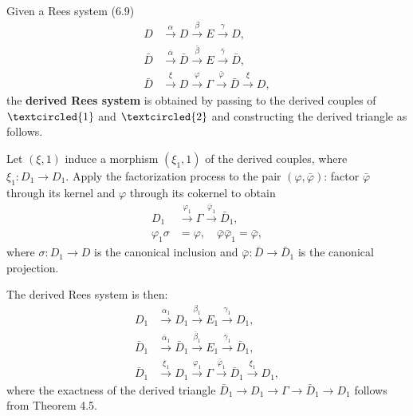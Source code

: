 Given a Rees system (6.9)
\begin{align*}
D &\xrightarrow{\alpha} D \xrightarrow{\beta} E \xrightarrow{\gamma} D, \\
\bar{D} &\xrightarrow{\bar{\alpha}} \bar{D} \xrightarrow{\bar{\beta}} E \xrightarrow{\bar{\gamma}} \bar{D}, \\
\bar{D} &\xrightarrow{\xi} D \xrightarrow{\varphi} \Gamma \xrightarrow{\bar{\varphi}} \bar{D} \xrightarrow{\xi} D,
\end{align*}
the \textbf{derived Rees system} is obtained by passing to the derived couples of $\textcircled{1}$ and $\textcircled{2}$ and constructing the derived triangle as follows.

Let $(\xi, 1)$ induce a morphism $(\xi_1, 1)$ of the derived couples, where $\xi_1 : D_1 \to D_1$. Apply the factorization process to the pair $(\varphi, \bar{\varphi})$: factor $\bar{\varphi}$ through its kernel and $\varphi$ through its cokernel to obtain
\begin{align*}
D_1 &\xrightarrow{\varphi_1} \Gamma \xrightarrow{\bar{\varphi}_1} \bar{D}_1, \\
\varphi_1 \sigma &= \varphi, \quad \bar{\varphi}\bar{\varphi}_1 = \bar{\varphi},
\end{align*}
where $\sigma : D_1 \to D$ is the canonical inclusion and $\bar{\varphi} : \bar{D} \to \bar{D}_1$ is the canonical projection.

The derived Rees system is then:
\begin{align*}
D_1 &\xrightarrow{\alpha_1} D_1 \xrightarrow{\beta_1} E_1 \xrightarrow{\gamma_1} D_1, \\
\bar{D}_1 &\xrightarrow{\bar{\alpha}_1} \bar{D}_1 \xrightarrow{\bar{\beta}_1} E_1 \xrightarrow{\bar{\gamma}_1} \bar{D}_1, \\
\bar{D}_1 &\xrightarrow{\xi_1} D_1 \xrightarrow{\varphi_1} \Gamma \xrightarrow{\bar{\varphi}_1} \bar{D}_1 \xrightarrow{\xi_1} D_1,
\end{align*}
where the exactness of the derived triangle $\bar{D}_1 \to D_1 \to \Gamma \to \bar{D}_1 \to D_1$ follows from Theorem 4.5.
